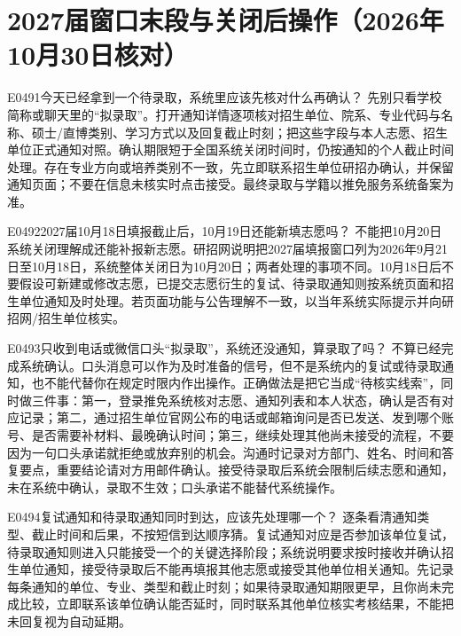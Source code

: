 
\section{2027届窗口末段与关闭后操作（2026年10月30日核对）}
\begin{qa}{E0491}{今天已经拿到一个待录取，系统里应该先核对什么再确认？}
先别只看学校简称或聊天里的“拟录取”。打开通知详情逐项核对招生单位、院系、专业代码与名称、硕士/直博类别、学习方式以及回复截止时刻；把这些字段与本人志愿、招生单位正式通知对照。确认期限短于全国系统关闭时间时，仍按通知的个人截止时间处理。存在专业方向或培养类别不一致，先立即联系招生单位研招办确认，并保留通知页面；不要在信息未核实时点击接受。最终录取与学籍以推免服务系统备案为准。
\end{qa}

\begin{qa}{E0492}{2027届10月18日填报截止后，10月19日还能新填志愿吗？}
不能把10月20日系统关闭理解成还能补报新志愿。研招网说明把2027届填报窗口列为2026年9月21日至10月18日，系统整体关闭日为10月20日；两者处理的事项不同。10月18日后不要假设可新建或修改志愿，已提交志愿衍生的复试、待录取通知则按系统页面和招生单位通知及时处理。若页面功能与公告理解不一致，以当年系统实际提示并向研招网/招生单位核实。
\end{qa}

\begin{qa}{E0493}{只收到电话或微信口头“拟录取”，系统还没通知，算录取了吗？}
不算已经完成系统确认。口头消息可以作为及时准备的信号，但不是系统内的复试或待录取通知，也不能代替你在规定时限内作出操作。正确做法是把它当成“待核实线索”，同时做三件事：第一，登录推免系统核对志愿、通知列表和本人状态，确认是否有对应记录；第二，通过招生单位官网公布的电话或邮箱询问是否已发送、发到哪个账号、是否需要补材料、最晚确认时间；第三，继续处理其他尚未接受的流程，不要因为一句口头承诺就拒绝或放弃别的机会。沟通时记录对方部门、姓名、时间和答复要点，重要结论请对方用邮件确认。接受待录取后系统会限制后续志愿和通知，未在系统中确认，录取不生效；口头承诺不能替代系统操作。
\end{qa}

\begin{qa}{E0494}{复试通知和待录取通知同时到达，应该先处理哪一个？}
逐条看清通知类型、截止时间和后果，不按短信到达顺序猜。复试通知对应是否参加该单位复试，待录取通知则进入只能接受一个的关键选择阶段；系统说明要求按时接收并确认招生单位通知，接受待录取后不能再填报其他志愿或接受其他单位相关通知。先记录每条通知的单位、专业、类型和截止时刻；如果待录取通知期限更早，且你尚未完成比较，立即联系该单位确认能否延时，同时联系其他单位核实考核结果，不能把未回复视为自动延期。
\end{qa}

